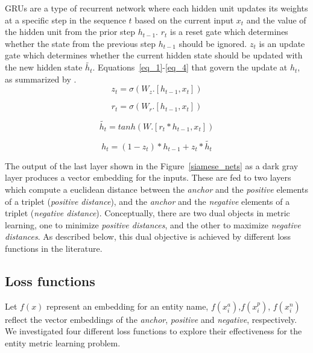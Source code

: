 GRUs are a type of recurrent network \cite{cho-al-emnlp14} where each hidden unit updates its weights at a specific step in the sequence $t$ based on the current input $x_t$ and the value of the hidden unit from the prior step $h_{t-1}$.  $r_t$ is a reset gate which determines whether the state from the previous step $h_{t-1}$ should be ignored. $z_t$ is an update gate which determines whether the current hidden state should be updated with the new hidden state $\tilde{h_t}$.  Equations~\ref{eq_1}-\ref{eq_4} that govern the update at $h_t$, as summarized by \cite{colah}.
\begin{equation}
z_t = \sigma(W_z . [h_{t-1}, x_t])
\label{eq_1}
\end{equation}

\begin{equation}
r_t = \sigma(W_r . [h_{t-1}, x_t])
\label{eq_2}
\end{equation}

\begin{equation}
\tilde{h_t} = tanh (W . [r_t * h_{t-1}, x_t])
\label{eq_3}
\end{equation}

\begin{equation}
h_t = (1- z_t) * h_{t-1} + z_t * \tilde{h_t}
\label{eq_4}
\end{equation}

The output of the last layer shown in the Figure~\ref{siamese_nets} as a dark gray layer produces a vector embedding for the inputs.  These are fed to two layers which compute a euclidean distance between the \textit{anchor} and the \textit{positive} elements of a triplet (\textit{positive distance}), and the \textit{anchor} and the \textit{negative} elements of a triplet (\textit{negative distance}).  Conceptually, there are two dual objects in metric learning, one to minimize \textit{positive distances}, and the other to maximize \textit{negative distances}.  As described below, this dual objective is achieved by different loss functions in the literature.

\subsection{Loss functions}
\label{loss_functions}
Let $f(x)$ represent an embedding for an entity name, $f(x_i^a)$,$f(x_i^p)$, $f(x_i^n)$ reflect the vector embeddings of the \textit{anchor}, \textit{positive} and \textit{negative}, respectively.  We investigated four different loss functions to explore their effectiveness for the entity metric learning problem.
